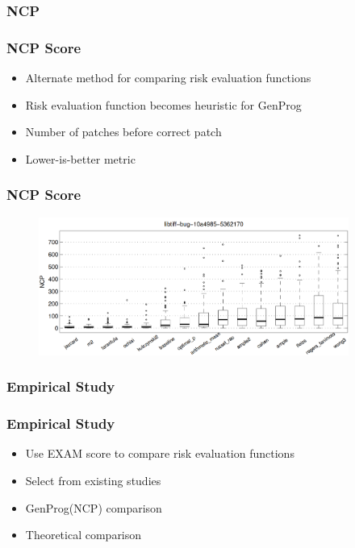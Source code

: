 \documentclass{beamer}
\begin{document}
	\subsubsection{NCP}
	\begin{frame}
	\frametitle{NCP Score}
	\begin{itemize}
    	\item Alternate method for comparing risk evaluation functions
    	\pause
    	\item Risk evaluation function becomes heuristic for GenProg
    	\pause
    	\item Number of patches before correct patch
    	\pause
    	\item Lower-is-better metric
	\end{itemize}
	\end{frame}
	\begin{frame}
	\frametitle{NCP Score}
	  	\begin{figure}
	  		\label{ncpeval}
	  		\includegraphics[width=4in]{img/ncpeval}
	  	\end{figure}
	\end{frame}
	\subsubsection{Empirical Study}
	\begin{frame}
	\frametitle{Empirical Study}
	\begin{itemize}
    	\item Use EXAM score to compare risk evaluation functions
    	\pause
    	\item Select from existing studies
    	\pause
    	\item GenProg(NCP) comparison
    	\pause
    	\item Theoretical comparison
	\end{itemize}
	\end{frame}
\end{document}
